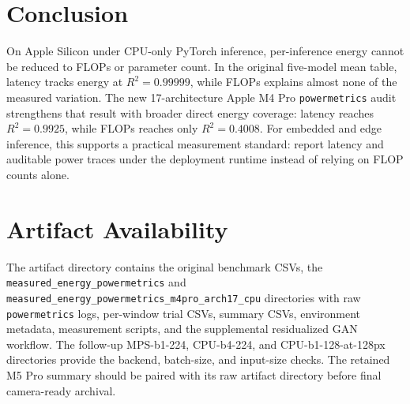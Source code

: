 \documentclass[conference]{IEEEtran}
\begin{document}
\section{Conclusion}

On Apple Silicon under CPU-only PyTorch inference, per-inference energy cannot
be reduced to FLOPs or parameter count. In the original five-model mean table,
latency tracks energy at $R^2=0.99999$, while FLOPs explains almost none of
the measured variation. The new 17-architecture Apple M4 Pro
\texttt{powermetrics} audit strengthens that result with broader direct energy
coverage: latency reaches $R^2=0.9925$, while FLOPs reaches only
$R^2=0.4008$. For embedded and edge inference, this supports a practical
measurement standard: report latency and auditable power traces under the
deployment runtime instead of relying on FLOP counts alone.

\section*{Artifact Availability}

The artifact directory contains the original benchmark CSVs, the
\texttt{measured\_energy\_powermetrics} and
\texttt{measured\_energy\_powermetrics\_m4pro\_arch17\_cpu} directories with raw
\texttt{powermetrics} logs, per-window trial CSVs, summary CSVs, environment
metadata, measurement scripts, and the supplemental residualized GAN workflow.
The follow-up MPS-b1-224, CPU-b4-224, and CPU-b1-128-at-128px directories
provide the backend, batch-size, and input-size checks.
The retained M5 Pro summary should be paired with its raw artifact directory
before final camera-ready archival.
\end{document}
